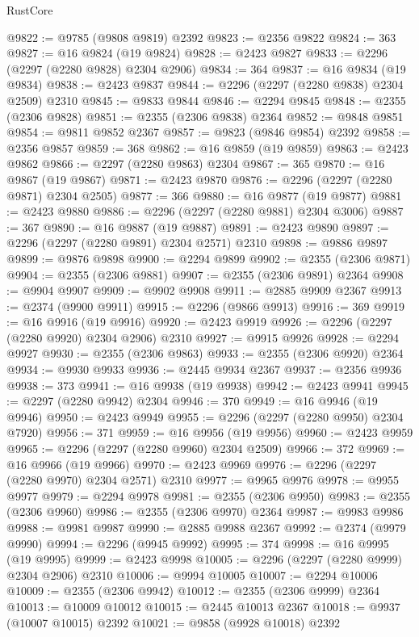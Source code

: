 \begin{lexlean}{RustCore}
\begin{coremodule}
@9822 := @9785 (@9808 @9819) @2392
@9823 := @2356 @9822
@9824 := 363
@9827 := @16 @9824 (@19 @9824)
@9828 := @2423 @9827
@9833 := @2296 (@2297 (@2280 @9828) @2304 @2906)
@9834 := 364
@9837 := @16 @9834 (@19 @9834)
@9838 := @2423 @9837
@9844 := @2296 (@2297 (@2280 @9838) @2304 @2509) @2310
@9845 := @9833 @9844
@9846 := @2294 @9845
@9848 := @2355 (@2306 @9828)
@9851 := @2355 (@2306 @9838) @2364
@9852 := @9848 @9851
@9854 := @9811 @9852 @2367
@9857 := @9823 (@9846 @9854) @2392
@9858 := @2356 @9857
@9859 := 368
@9862 := @16 @9859 (@19 @9859)
@9863 := @2423 @9862
@9866 := @2297 (@2280 @9863) @2304
@9867 := 365
@9870 := @16 @9867 (@19 @9867)
@9871 := @2423 @9870
@9876 := @2296 (@2297 (@2280 @9871) @2304 @2505)
@9877 := 366
@9880 := @16 @9877 (@19 @9877)
@9881 := @2423 @9880
@9886 := @2296 (@2297 (@2280 @9881) @2304 @3006)
@9887 := 367
@9890 := @16 @9887 (@19 @9887)
@9891 := @2423 @9890
@9897 := @2296 (@2297 (@2280 @9891) @2304 @2571) @2310
@9898 := @9886 @9897
@9899 := @9876 @9898
@9900 := @2294 @9899
@9902 := @2355 (@2306 @9871)
@9904 := @2355 (@2306 @9881)
@9907 := @2355 (@2306 @9891) @2364
@9908 := @9904 @9907
@9909 := @9902 @9908
@9911 := @2885 @9909 @2367
@9913 := @2374 (@9900 @9911)
@9915 := @2296 (@9866 @9913)
@9916 := 369
@9919 := @16 @9916 (@19 @9916)
@9920 := @2423 @9919
@9926 := @2296 (@2297 (@2280 @9920) @2304 @2906) @2310
@9927 := @9915 @9926
@9928 := @2294 @9927
@9930 := @2355 (@2306 @9863)
@9933 := @2355 (@2306 @9920) @2364
@9934 := @9930 @9933
@9936 := @2445 @9934 @2367
@9937 := @2356 @9936
@9938 := 373
@9941 := @16 @9938 (@19 @9938)
@9942 := @2423 @9941
@9945 := @2297 (@2280 @9942) @2304
@9946 := 370
@9949 := @16 @9946 (@19 @9946)
@9950 := @2423 @9949
@9955 := @2296 (@2297 (@2280 @9950) @2304 @7920)
@9956 := 371
@9959 := @16 @9956 (@19 @9956)
@9960 := @2423 @9959
@9965 := @2296 (@2297 (@2280 @9960) @2304 @2509)
@9966 := 372
@9969 := @16 @9966 (@19 @9966)
@9970 := @2423 @9969
@9976 := @2296 (@2297 (@2280 @9970) @2304 @2571) @2310
@9977 := @9965 @9976
@9978 := @9955 @9977
@9979 := @2294 @9978
@9981 := @2355 (@2306 @9950)
@9983 := @2355 (@2306 @9960)
@9986 := @2355 (@2306 @9970) @2364
@9987 := @9983 @9986
@9988 := @9981 @9987
@9990 := @2885 @9988 @2367
@9992 := @2374 (@9979 @9990)
@9994 := @2296 (@9945 @9992)
@9995 := 374
@9998 := @16 @9995 (@19 @9995)
@9999 := @2423 @9998
@10005 := @2296 (@2297 (@2280 @9999) @2304 @2906) @2310
@10006 := @9994 @10005
@10007 := @2294 @10006
@10009 := @2355 (@2306 @9942)
@10012 := @2355 (@2306 @9999) @2364
@10013 := @10009 @10012
@10015 := @2445 @10013 @2367
@10018 := @9937 (@10007 @10015) @2392
@10021 := @9858 (@9928 @10018) @2392

\end{coremodule}
\end{lexlean}

